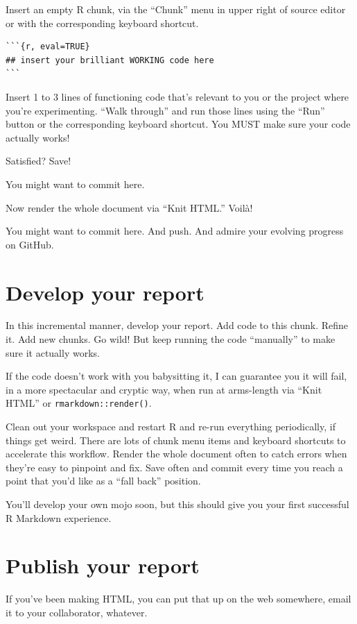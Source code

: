 \documentclass[
]{book}
\begin{document}
Insert an empty R chunk, via the ``Chunk'' menu in upper right of source editor or with the corresponding keyboard shortcut.

\begin{verbatim}
```{r, eval=TRUE}
## insert your brilliant WORKING code here
```
\end{verbatim}

Insert 1 to 3 lines of functioning code that's relevant to you or the project where you're experimenting.
``Walk through'' and run those lines using the ``Run'' button or the corresponding keyboard shortcut.
You MUST make sure your code actually works!

Satisfied? Save!

You might want to commit here.

Now render the whole document via ``Knit HTML.'' Voilà!

You might want to commit here.
And push.
And admire your evolving progress on GitHub.

\section{Develop your report}\label{develop-your-report}

In this incremental manner, develop your report.
Add code to this chunk.
Refine it.
Add new chunks.
Go wild!
But keep running the code ``manually'' to make sure it actually works.

If the code doesn't work with you babysitting it, I can guarantee you it will fail, in a more spectacular and cryptic way, when run at arms-length via ``Knit HTML'' or \texttt{rmarkdown::render()}.

Clean out your workspace and restart R and re-run everything periodically, if things get weird.
There are lots of chunk menu items and keyboard shortcuts to accelerate this workflow.
Render the whole document often to catch errors when they're easy to pinpoint and fix.
Save often and commit every time you reach a point that you'd like as a ``fall back'' position.

You'll develop your own mojo soon, but this should give you your first successful R Markdown experience.

\section{Publish your report}\label{publish-your-report}

If you've been making HTML, you can put that up on the web somewhere, email it to your collaborator, whatever.
\end{document}
